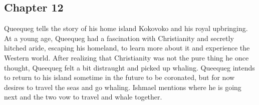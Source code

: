 \subsection{Chapter 12}

Queequeg tells the story of his home island Kokovoko and his royal upbringing.
At a young age, Queequeg had a fascination with Christianity and secretly
hitched aride, escaping his homeland, to learn more about it and experience the
Western world. After realizing that Christianity was not the pure thing he once
thought, Queequeg felt a bit distraught and picked up whaling. Queequeg intends
to return to his island sometime in the future to be coronated, but for now
desires to travel the seas and go whaling. Ishmael mentions where he is going
next and the two vow to travel and whale together.

